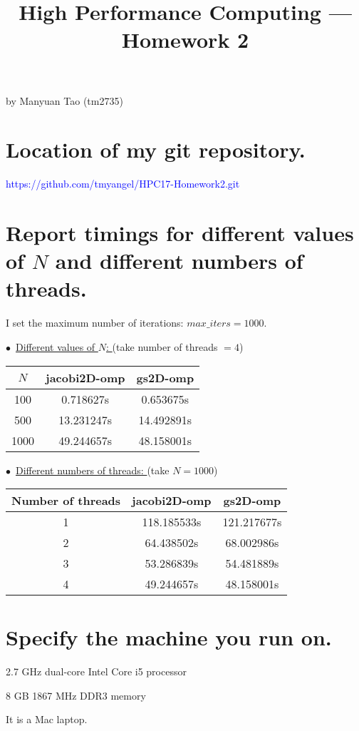 \documentclass[a4paper,12pt]{article}
\title{\Large High Performance Computing --- Homework 2}
\begin{document}
\maketitle
\vspace{1em}
\begin{center}
{\large by {Manyuan Tao} (tm2735)}
\end{center}
\vspace{1em}

\section{Location of my git repository.}

\textcolor{blue}{https://github.com/tmyangel/HPC17-Homework2.git}

\vspace{3em}
\section{Report timings for different values of $N$ and different numbers of threads.}

I set the maximum number of iterations: $max\_iters=1000$.

$\bullet$\ \underline{Different values of $N$: } (take number of threads $=4$)

\vspace{6pt}
\begin{center}
\linespread{1.2}\selectfont
\begin{tabular}{|c|c|c|}
\hline
$N$ & jacobi2D-omp & gs2D-omp \\ \hline
100 & 0.718627s & 0.653675s \\ \hline
500 & 13.231247s & 14.492891s \\ \hline
1000 & 49.244657s & 48.158001s \\ \hline
\end{tabular}
\end{center}

\vspace{6pt}
$\bullet$\ \underline{Different numbers of threads: } (take $N=1000$)

\vspace{6pt}
\begin{center}
\linespread{1.2}\selectfont
\begin{tabular}{|c|c|c|}
\hline
Number of threads & jacobi2D-omp & gs2D-omp \\ \hline
1 & 118.185533s & 121.217677s \\ \hline
2 & 64.438502s & 68.002986s \\ \hline
3 & 53.286839s & 54.481889s \\ \hline
4 & 49.244657s & 48.158001s \\ \hline
\end{tabular}
\end{center}

\vspace{3em}
\section{Specify the machine you run on.}

2.7 GHz dual-core Intel Core i5 processor

8 GB 1867 MHz DDR3 memory

It is a Mac laptop.
\end{document}
